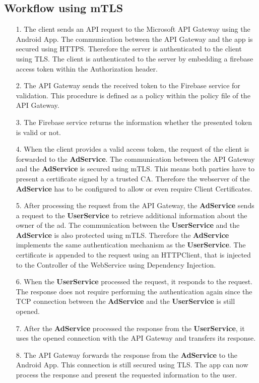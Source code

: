 \subsection{Workflow using mTLS}
\begin{enumerate}
	\item[1.] The client sends an API request to the Microsoft API Gateway using the Android App.
		The communication between the API Gateway and the app is secured using HTTPS.
		Therefore the server is authenticated to the client using TLS.
		The client is authenticated to the server by embedding a firebase access token within the Authorization header.
	\item[2.] The API Gateway sends the received token to the Firebase service for validation.
		This procedure is defined as a policy within the policy file of the API Gateway.
		\newpage
	\item[3.] The Firebase service returns the information whether the presented token is valid or not.
	\item[4.] When the client provides a valid access token, the request of the client is forwarded to the \textbf{AdService}.
		The communication between the API Gateway and the \textbf{AdService} is secured using mTLS.
		This means both parties have to present a certificate signed by a trusted CA.
		Therefore the webserver of the \textbf{AdService} has to be configured to allow or even require Client Certificates.
	\item[5.] After processing the request from the API Gateway, the \textbf{AdService} sends a request to the \textbf{UserService} to retrieve additional information about the owner of the ad.
		The communication between the \textbf{UserService} and the \textbf{AdService} is also protected using mTLS.
		Therefore the \textbf{AdService} implements the same authentication mechanism as the \textbf{UserService}.
		The certificate is appended to the request using an HTTPClient, that is injected to the Controller of the WebService using Dependency Injection.
	\item[6.] When the \textbf{UserService} processed the request, it responds to the request.
		The response does not require performing the authentication again since the TCP connection between the \textbf{AdService} and the \textbf{UserService} is still opened.
	\item[7.] After the \textbf{AdService} processed the response from the \textbf{UserService}, it uses the opened connection with the API Gateway and transfers its response.
	\item[8.] The API Gateway forwards the response from the \textbf{AdService} to the Android App.
		This connection is still secured using TLS. 
		The app can now process the response and present the requested information to the user.
\end{enumerate}

